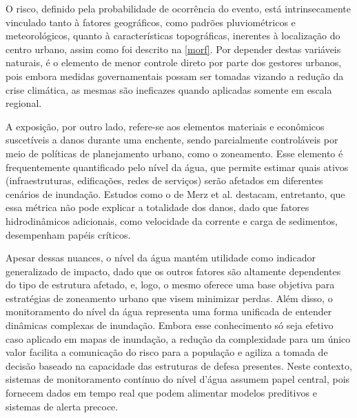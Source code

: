 O risco, definido pela probabilidade de ocorrência do evento, está intrinsecamente vinculado tanto à fatores
geográficos, como padrões pluviométricos e meteorológicos, quanto à características topográficas, inerentes à
localização do centro urbano, assim como foi descrito na \autoref{morf}. Por depender destas variáveis naturais, é o
elemento de menor controle direto por parte dos gestores urbanos, pois embora medidas governamentais possam ser tomadas
vizando a redução da crise climática, as mesmas são ineficazes quando aplicadas somente em escala regional.


A exposição, por outro lado, refere-se aos elementos materiais e econômicos suscetíveis a danos durante uma enchente,
sendo parcialmente controláveis por meio de políticas de planejamento urbano, como o zoneamento. Esse elemento é
frequentemente quantificado pelo nível da água, que permite estimar quais ativos (infraestruturas, edificações, redes de
serviços) serão afetados em diferentes cenários de inundação. Estudos como o de Merz et al. \cite{merz} destacam,
entretanto, que essa métrica não pode explicar a totalidade dos danos, dado que fatores hidrodinâmicos adicionais, como
velocidade da corrente e carga de sedimentos, desempenham papéis críticos.

Apesar dessas nuances, o nível da água mantém utilidade como indicador generalizado de impacto, dado que os outros
fatores são altamente dependentes do tipo de estrutura afetado, e, logo, o mesmo oferece uma base objetiva para
estratégias de zoneamento urbano que visem minimizar perdas. Além disso, o monitoramento do nível da água representa uma
forma unificada de entender dinâmicas complexas de inundação. Embora esse conhecimento só seja efetivo caso aplicado em
mapas de inundação, a redução da complexidade para um único valor facilita a comunicação do risco para a população e
agiliza a tomada de decisão baseado na capacidade das estruturas de defesa presentes. Neste contexto, sistemas de
monitoramento contínuo do nível d'água assumem papel central, pois fornecem dados em tempo real que podem alimentar
modelos preditivos e sistemas de alerta precoce.

